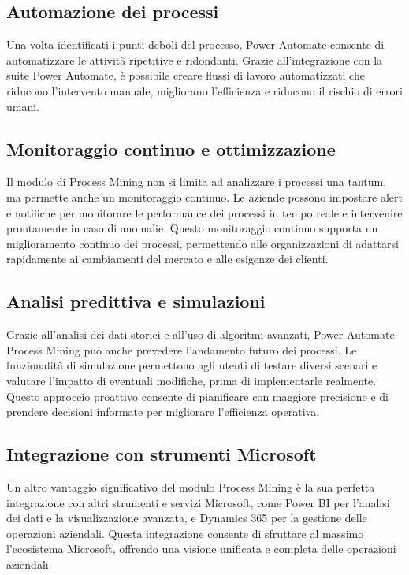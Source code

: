 \documentclass{article}
\begin{document}
\subsection{Automazione dei processi}
Una volta identificati i punti deboli del processo, Power Automate consente di automatizzare le attività ripetitive e ridondanti. Grazie all'integrazione con la suite Power Automate, è possibile creare flussi di lavoro automatizzati che riducono l'intervento manuale, migliorano l'efficienza e riducono il rischio di errori umani.

\subsection{Monitoraggio continuo e ottimizzazione}
Il modulo di Process Mining non si limita ad analizzare i processi una tantum, ma permette anche un monitoraggio continuo. Le aziende possono impostare alert e notifiche per monitorare le performance dei processi in tempo reale e intervenire prontamente in caso di anomalie. Questo monitoraggio continuo supporta un miglioramento continuo dei processi, permettendo alle organizzazioni di adattarsi rapidamente ai cambiamenti del mercato e alle esigenze dei clienti.

\subsection{Analisi predittiva e simulazioni}
Grazie all'analisi dei dati storici e all'uso di algoritmi avanzati, Power Automate Process Mining può anche prevedere l'andamento futuro dei processi. Le funzionalità di simulazione permettono agli utenti di testare diversi scenari e valutare l'impatto di eventuali modifiche, prima di implementarle realmente. Questo approccio proattivo consente di pianificare con maggiore precisione e di prendere decisioni informate per migliorare l'efficienza operativa.

\subsection{Integrazione con strumenti Microsoft}
Un altro vantaggio significativo del modulo Process Mining è la sua perfetta integrazione con altri strumenti e servizi Microsoft, come Power BI per l'analisi dei dati e la visualizzazione avanzata, e Dynamics 365 per la gestione delle operazioni aziendali. Questa integrazione consente di sfruttare al massimo l'ecosistema Microsoft, offrendo una visione unificata e completa delle operazioni aziendali.
\end{document}
